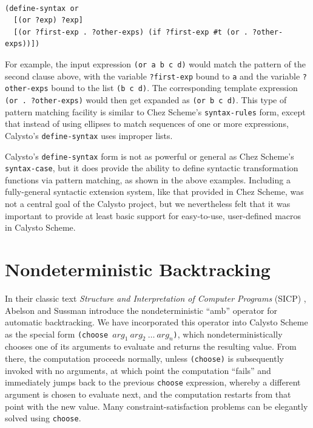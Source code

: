 \documentclass[acmsmall,screen,authorversion]{acmart}
\begin{document}
\begin{minipage}{\textwidth}
\begin{verbatim}

(define-syntax or
  [(or ?exp) ?exp]
  [(or ?first-exp . ?other-exps) (if ?first-exp #t (or . ?other-exps))])

\end{verbatim}
\end{minipage}

\noindent
For example, the input expression \texttt{(or a b c d)} would match the pattern
of the second clause above, with the variable \texttt{?first-exp} bound to
\texttt{a} and the variable \texttt{?other-exps} bound to the list
\texttt{(b~c~d)}. The corresponding template expression
\texttt{(or~.~?other-exps)} would then get expanded as \texttt{(or~b~c~d)}.
This type of pattern matching facility is similar to Chez Scheme's
\texttt{syntax-rules} form, except that instead of using ellipses to match
sequences of one or more expressions, Calysto's \texttt{define-syntax} uses
improper lists.

Calysto's \texttt{define-syntax} form is not as powerful or general as Chez
Scheme's \texttt{syntax-case}, but it does provide the ability to define
syntactic transformation functions via pattern matching, as shown in the above
examples.  Including a fully-general syntactic extension system, like that
provided in Chez Scheme, was not a central goal of the Calysto project, but we
nevertheless felt that it was important to provide at least basic support for
easy-to-use, user-defined macros in Calysto Scheme.

\section{Nondeterministic Backtracking}

\noindent
In their classic text \emph{Structure and Interpretation of Computer Programs}
(SICP) \cite{SICP}, Abelson and Sussman introduce the nondeterministic ``amb''
operator for automatic backtracking.  We have incorporated this operator into
Calysto Scheme as the special form
\texttt{(choose~$\mathit{arg}_1~\mathit{arg}_2~\ldots~\mathit{arg}_n$)}, which
nondeterministically chooses one of its arguments to evaluate and returns the
resulting value.  From there, the computation proceeds normally, unless
\texttt{(choose)} is subsequently invoked with no arguments, at which point the
computation ``fails'' and immediately jumps back to the previous
\texttt{choose} expression, whereby a different argument is chosen to evaluate
next, and the computation restarts from that point with the new value.  Many
constraint-satisfaction problems can be elegantly solved using \texttt{choose}.
\end{document}
